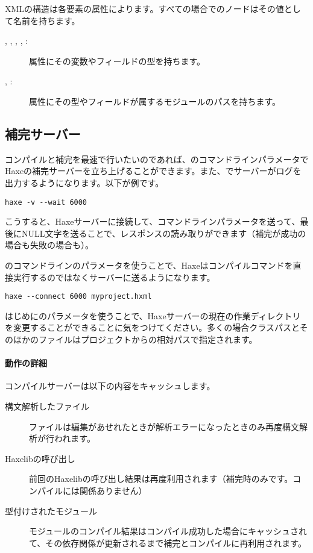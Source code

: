 XMLの構造は各要素の属性によります。すべての場合でのノードはその値として名前を持ちます。

\begin{description}
	\item[, , , , :] 属性にその変数やフィールドの型を持ちます。
	\item[, :] 属性にその型やフィールドが属するモジュールのパスを持ちます。
\end{description}

\subsection{補完サーバー}
\label{cr-completion-server}

コンパイルと補完を最速で行いたいのであれば、のコマンドラインパラメータでHaxeの補完サーバーを立ち上げることができます。また、でサーバーがログを出力するようになります。以下が例です。

\begin{lstlisting}
haxe -v --wait 6000
\end{lstlisting}

こうすると、Haxeサーバーに接続して、コマンドラインパラメータを送って、最後にNULL文字を送ることで、レスポンスの読み取りができます（補完が成功の場合も失敗の場合も）。

のコマンドラインのパラメータを使うことで、Haxeはコンパイルコマンドを直接実行するのではなくサーバーに送るようになります。

\begin{lstlisting}
haxe --connect 6000 myproject.hxml
\end{lstlisting}

はじめにのパラメータを使うことで、Haxeサーバーの現在の作業ディレクトリを変更することができることに気をつけてください。多くの場合クラスパスとそのほかのファイルはプロジェクトからの相対パスで指定されます。

\paragraph{動作の詳細}

コンパイルサーバーは以下の内容をキャッシュします。

\begin{description}
	\item[構文解析したファイル] ファイルは編集があせれたときが解析エラーになったときのみ再度構文解析が行われます。
	\item[Haxelibの呼び出し] 前回のHaxelibの呼び出し結果は再度利用されます（補完時のみです。コンパイルには関係ありません）
	\item[型付けされたモジュール] モジュールのコンパイル結果はコンパイル成功した場合にキャッシュされて、その依存関係が更新されるまで補完とコンパイルに再利用されます。
\end{description}

